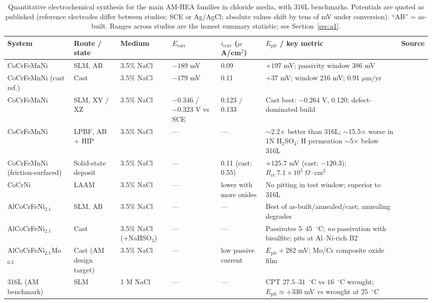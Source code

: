 \begin{table}[t]
\centering
\caption{Quantitative electrochemical synthesis for the main AM-HEA families in chloride media, with 316L benchmarks. Potentials are quoted as published (reference electrodes differ between studies: SCE or Ag/AgCl; absolute values shift by tens of mV under conversion). ``AB'' = as-built. Ranges across studies are the honest summary statistic; see Section~\ref{sec:a1}.}
\label{tab:electrochem}
\footnotesize
\begin{tabularx}{\textwidth}{@{}llllllX@{}}
\toprule
System & Route / state & Medium & $E_{\mathrm{corr}}$ & $i_{\mathrm{corr}}$ ($\mu$A/cm$^2$) & $E_{\mathrm{pit}}$ / key metric & Source \\
\midrule
CoCrFeMnNi & SLM, AB & 3.5\% NaCl & $-189$ mV & 0.09 & $+197$ mV; passivity window 386 mV & \cite{met2019slmcorr} \\
CoCrFeMnNi (cast ref.) & Cast & 3.5\% NaCl & $-179$ mV & 0.11 & $+37$ mV; window 216 mV; 0.91 $\mu$m/yr & \cite{met2019slmcorr} \\
CoCrFeMnNi & SLM, XY / XZ & 3.5\% NaCl & $-0.346$ / $-0.323$ V vs SCE & 0.123 / 0.133 & Cast best: $-0.264$ V, 0.120; defect-dominated build & \cite{frontiers2020slmcast} \\
CoCrFeMnNi & LPBF, AB + HIP & 3.5\% NaCl & --- & --- & $\sim$2.2$\times$ better than 316L; $\sim$15.5$\times$ worse in 1N H$_2$SO$_4$; H permeation $\sim$5$\times$ below 316L & \cite{lpbf_cantor_2024} \\
CoCrFeMnNi (friction-surfaced) & Solid-state deposit & 3.5\% NaCl & --- & 0.11 (cast: 0.55) & $+125.7$ mV (cast: $-120.3$); $R_{\mathrm{ct}}\ 7.1\times10^{5}\ \Omega\cdot$cm$^2$ & \cite{fs_coating2026} \\
CoCrNi & LAAM & 3.5\% NaCl & --- & lower with more oxides & No pitting in test window; superior to 316L & \cite{laam_cocrni2021} \\
AlCoCrFeNi$_{2.1}$ & SLM, AB & 3.5\% NaCl & --- & --- & Best of as-built/annealed/cast; annealing degrades & \cite{slm_ehea_2025} \\
AlCoCrFeNi$_{2.1}$ & Cast & 3.5\% NaCl (+NaHSO$_3$) & --- & --- & Passivates 5--45~$^{\circ}$C; \emph{no} passivation with bisulfite; pits at Al--Ni-rich B2 & \cite{jac_ehea2023} \\
AlCoCrFeNi$_{2.1}$Mo$_{0.3}$ & Cast (AM design target) & 3.5\% NaCl & --- & low passive current & $E_{\mathrm{pit}} +282$ mV; Mo/Cr composite oxide film & \cite{mo_ehea_2026} \\
316L (AM benchmark) & SLM & 1 M NaCl & --- & --- & CPT $27.5$--$31$~$^{\circ}$C vs $16$~$^{\circ}$C wrought; $E_{\mathrm{pit}} \approx +330$ mV vs wrought at 25~$^{\circ}$C & \cite{slm316l_cpt} \\
\bottomrule
\end{tabularx}
\end{table}
